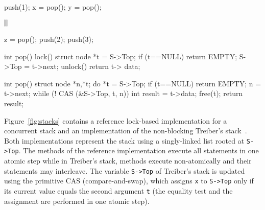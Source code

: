 \begin{figure*}[t]
\begin{minipage}{5cm}
\begin{minipage}{1.7cm}
\begin{program}
push(1);
x = pop();
y = pop();
\end{program}
\end{minipage}
\hspace{1mm}
{\large $\bigparallel$}
\hspace{2mm}
\begin{minipage}{2cm}
\begin{program}
z = pop();
push(2);
push(3);
\end{program}
\end{minipage}
\end{minipage}
\begin{minipage}{6.5cm}
\lstset{firstnumber=10}
\begin{program}
int pop() {
	lock()
	struct node *t = S->Top;
	if (t==NULL)
		return EMPTY;
	S->Top = t->next;
	unlock()
	return t-> data;
}
\end{program}
\end{minipage}
\begin{minipage}{6cm}
\lstset{firstnumber=10}
\begin{program}
int pop() {
	struct node *n,*t;
	do {
		*t = S->Top;
		if (t==NULL)
			return EMPTY;
		n = t->next;
	} while (! CAS (&S->Top, t, n))
	int result = t->data;
	free(t);
	return result;
}

\end{program}
\end{minipage}
\caption{A reference lock-based implementation of a concurrent stack and Treiber's stack implementation. The client program $P$ consists of two concurrent threads; $\parallel$ denotes the fact that these two threads may interleave.}
\label{fig:stacks}
\end{figure*}

Figure~\ref{fig:stacks} contains a reference lock-based implementation for a concurrent stack and an implementation of the non-blocking Treiber's stack~\cite{Treiber'86}. Both implementations represent the stack using a singly-linked list rooted at {\tt S->Top}. The methods of the reference implementation execute all statements in one atomic step while in Treiber's stack, methods execute non-atomically and their statements may interleave. The variable {\tt S->Top} of Treiber's stack is updated using the primitive CAS (compare-and-swap), which assigns {\tt x} to {\tt S->Top} only if its current value equals the second argument {\tt t} (the equality test and the assignment are performed in one atomic step).

